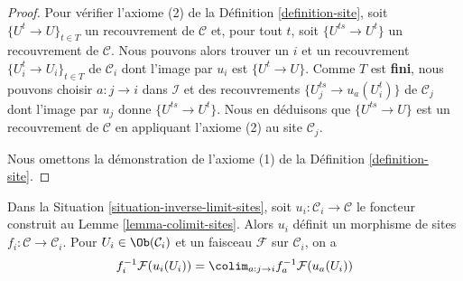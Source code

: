 \begin{proof}
\medskip\noindent
Pour vérifier l’axiome (2) de la Définition \ref{definition-site},
soit $\{U^t \to U\}_{t \in T}$ un recouvrement de $\mathcal{C}$ et,
pour tout $t$, soit $\{U^{ts} \to U^t\}$ un recouvrement de
$\mathcal{C}$. Nous pouvons alors trouver un $i$ et un recouvrement
$\{U^t_i \to U_i\}_{t \in T}$ de $\mathcal{C}_i$ dont l’image par $u_i$ est
$\{U^t \to U\}$. Comme $T$ est {\bf fini}, nous pouvons choisir
$a : j \to i$ dans $\mathcal{I}$ et des recouvrements
$\{U^{ts}_j \to u_a(U^t_i)\}$ de $\mathcal{C}_j$ dont l’image par $u_j$
donne $\{U^{ts} \to U^t\}$.
Nous en déduisons que $\{U^{ts} \to U\}$ est un recouvrement de $\mathcal{C}$
en appliquant l’axiome (2) au site $\mathcal{C}_j$.

\medskip\noindent
Nous omettons la démonstration de l’axiome (1) de la
Définition \ref{definition-site}.
\end{proof}

\begin{lemma}
\label{lemma-compute-pullback-to-limit}
Dans la Situation \ref{situation-inverse-limit-sites}, soit
$u_i : \mathcal{C}_i \to \mathcal{C}$ le foncteur construit au
Lemme \ref{lemma-colimit-sites}. Alors $u_i$ définit un morphisme
de sites $f_i : \mathcal{C} \to \mathcal{C}_i$. Pour
$U_i \in \Ob(\mathcal{C}_i)$ et un faisceau $\mathcal{F}$ sur $\mathcal{C}_i$,
on a
\begin{equation}
\label{equation-compute-pullback-to-limit}
f_i^{-1}\mathcal{F}(u_i(U_i)) =
\colim_{a : j \to i} f_a^{-1}\mathcal{F}(u_a(U_i))
\end{equation}
\end{lemma}

